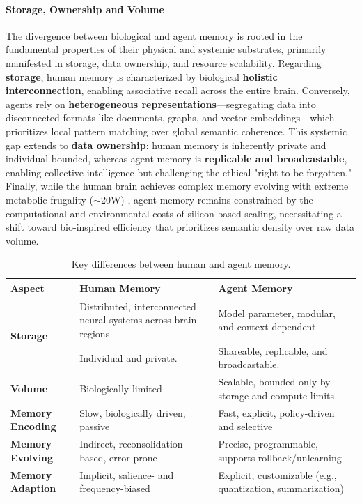 \documentclass[manuscript,screen]{acmart}
\begin{document}
\paragraph{Storage, Ownership and Volume}
The divergence between biological and agent memory is rooted in the fundamental properties of their physical and systemic substrates, primarily manifested in storage, data ownership, and resource scalability. Regarding \textbf{storage}, human memory is characterized by biological \textbf{holistic interconnection}, enabling associative recall across the entire brain. Conversely, agents rely on \textbf{heterogeneous representations}—segregating data into disconnected formats like documents, graphs, and vector embeddings—which prioritizes local pattern matching over global semantic coherence. This systemic gap extends to \textbf{data ownership}: human memory is inherently private and individual-bounded, whereas agent memory is \textbf{replicable and broadcastable}, enabling collective intelligence but challenging the ethical "right to be forgotten." Finally, while the human brain achieves complex memory evolving with extreme metabolic frugality ($\sim$20W) \citep{balasubramanian2021brain}, agent memory remains constrained by the computational and environmental costs of silicon-based scaling, necessitating a shift toward bio-inspired efficiency that prioritizes semantic density over raw data volume.


\begin{table}[t!]
\centering
\small
\renewcommand{\arraystretch}{1}
\begin{tabular}{p{2.5cm} p{5cm} p{5cm}}
\toprule
\textbf{Aspect} & \textbf{Human Memory} & \textbf{Agent Memory} \\
\midrule
\multirow{2}{*}{\raggedright\arraybackslash \textbf{Storage}} & Distributed, interconnected neural systems across brain regions & Model parameter, modular, and context-dependent \\ \addlinespace

\textbf{Ownership} & Individual and private. & Shareable, replicable, and broadcastable. \\
\addlinespace
\textbf{Volume} & Biologically limited & Scalable, bounded only by storage and compute limits \\ \addlinespace
\textbf{Memory Encoding} & Slow, biologically driven, passive & Fast, explicit, policy-driven and selective \\ \addlinespace
\textbf{Memory Evolving} & Indirect, reconsolidation-based, error-prone & Precise, programmable, supports rollback/unlearning \\
\addlinespace
\textbf{Memory Adaption} & Implicit, salience- and frequency-biased & Explicit, customizable (e.g., quantization, summarization) \\
\bottomrule
\end{tabular}
\caption{Key differences between human and agent memory.}
\label{tab:memory_comparison}
\end{table}
\end{document}
